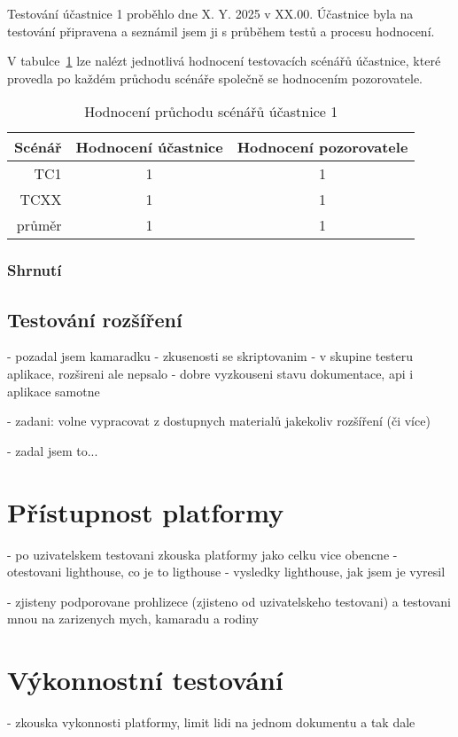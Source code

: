 Testování účastnice 1 proběhlo dne X. Y. 2025 v XX.00. 
Účastnice byla na testování připravena a seznámil jsem ji s průběhem testů a procesu hodnocení. 

V tabulce~\ref{tab:hodnoceniPruchoduUcastnika1} lze nalézt jednotlivá hodnocení testovacích scénářů účastnice, které provedla po každém průchodu scénáře společně se hodnocením pozorovatele.

\begin{table}[ht!]
\centering
    \caption{Hodnocení průchodu scénářů účastnice 1}\label{tab:hodnoceniPruchoduUcastnika1}
    \begin{tabular}{r|c|c}
        Scénář & Hodnocení účastnice & Hodnocení pozorovatele\\\hline\hline
        TC1  & 1 & 1\\\hline
        TCXX & 1 & 1\\\hline\hline
        průměr & 1 & 1\\
    \end{tabular}
\end{table}

\subsubsection{Shrnutí}

\subsection{Testování rozšíření}

- pozadal jsem kamaradku
- zkusenosti se skriptovanim
- v skupine testeru aplikace, rozšireni ale nepsalo
- dobre vyzkouseni stavu dokumentace, api i aplikace samotne

- zadani: volne vypracovat z dostupnych materialů jakekoliv rozšíření (či více)

- zadal jsem to...


\section{Přístupnost platformy}

- po uzivatelskem testovani zkouska platformy jako celku vice obencne
- otestovani lighthouse, co je to ligthouse
- vysledky lighthouse, jak jsem je vyresil

- zjisteny podporovane prohlizece (zjisteno od uzivatelskeho testovani) a testovani mnou na zarizenych mych, kamaradu a rodiny

\section{Výkonnostní testování}

- zkouska vykonnosti platformy, limit lidi na jednom dokumentu a tak dale


